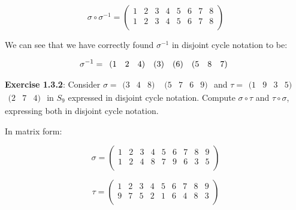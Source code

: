 \documentclass[a4paper]{article}
\begin{document}
\begin{myparindent}{0pt}
\[
    \sigma \circ \sigma^{-1} =
    \begin{pmatrix}
        1 & 2 & 3 & 4 & 5 & 6 & 7 & 8 \\
        1 & 2 & 3 & 4 & 5 & 6 & 7 & 8 \\
    \end{pmatrix}
\]

We can see that we have correctly found $\sigma^{-1}$ in disjoint cycle notation to be:

\[
    \noindent \sigma^{-1} = \begin{array}{rrr} (1 & 2 & 4) \end{array}
    \noindent \begin{array}{r} (3) \end{array}
    \noindent \begin{array}{r} (6) \end{array}
    \noindent \begin{array}{rrr} (5 & 8 & 7) \end{array}
\]

\textbf{Exercise 1.3.2}:
\noindent Consider $\sigma = \begin{array}{rrr} (3 & 4 & 8) \end{array}$  $\begin{array}{rrrr} (5 & 7 & 6 & 9) \end{array}$
and $\tau = \begin{array}{rrrr} (1 & 9 & 3 & 5) \end{array}$ $\begin{array}{rrrr} (2 & 7 & 4) \end{array}$
in $S_9$ expressed in disjoint cycle notation.
Compute $\sigma \circ \tau$ and $\tau \circ \sigma$, expressing both in disjoint cycle notation. \newline

In matrix form:

\[
    \sigma =
    \begin{pmatrix}
        1 & 2 & 3 & 4 & 5 & 6 & 7 & 8 & 9 \\
        1 & 2 & 4 & 8 & 7 & 9 & 6 & 3 & 5 \\
    \end{pmatrix}
\]

\[
    \tau =
    \begin{pmatrix}
        1 & 2 & 3 & 4 & 5 & 6 & 7 & 8 & 9 \\
        9 & 7 & 5 & 2 & 1 & 6 & 4 & 8 & 3 \\
    \end{pmatrix}
\]


\end{myparindent}
\end{document}
